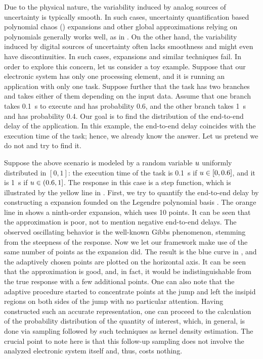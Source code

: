 
Due to the physical nature, the variability induced by analog sources of
uncertainty is typically smooth. In such cases, uncertainty quantification based
polynomial chaos () expansions \cite{xiu2010} and other global
approximations relying on polynomials generally works well, as in
\cite{bhardwaj2008, lee2013, ukhov2014, ukhov2015}. On the other hand, the
variability induced by digital sources of uncertainty often lacks smoothness and
might even have discontinuities. In such cases,  expansions and similar
techniques fail. In order to explore this concern, let us consider a toy
example. Suppose that our electronic system has only one processing element, and
it is running an application with only one task. Suppose further that the task
has two branches and takes either of them depending on the input data. Assume
that one branch takes 0.1~s to execute and has probability 0.6, and the other
branch takes 1~s and has probability 0.4. Our goal is to find the distribution
of the end-to-end delay of the application. In this example, the end-to-end
delay coincides with the execution time of the task; hence, we already know the
answer. Let us pretend we do not and try to find it.

Suppose the above scenario is modeled by a random variable $u$ uniformly
distributed in $[0, 1]$: the execution time of the task is 0.1~s if $u \in [0,
0.6]$, and it is 1~s if $u \in (0.6, 1]$. The response in this case is a step
function, which is illustrated by the yellow line in . First,
we try to quantify the end-to-end delay by constructing a  expansion
founded on the Legendre polynomial basis \cite{xiu2010}. The orange line in
 shows a ninth-order  expansion, which uses 10 points.
It can be seen that the approximation is poor, not to mention negative
end-to-end delays. The observed oscillating behavior is the well-known Gibbs
phenomenon, stemming from the steepness of the response. Now we let our
framework make use of the same number of points as the  expansion did.
The result is the blue curve in , and the adaptively chosen
points are plotted on the horizontal axis. It can be seen that the approximation
is good, and, in fact, it would be indistinguishable from the true response with
a few additional points. One can also note that the adaptive procedure started
to concentrate points at the jump and left the insipid regions on both sides of
the jump with no particular attention. Having constructed such an accurate
representation, one can proceed to the calculation of the probability
distribution of the quantity of interest, which, in general, is done via
sampling followed by such techniques as kernel density estimation. The crucial
point to note here is that this follow-up sampling does not involve the analyzed
electronic system itself and, thus, costs nothing.

